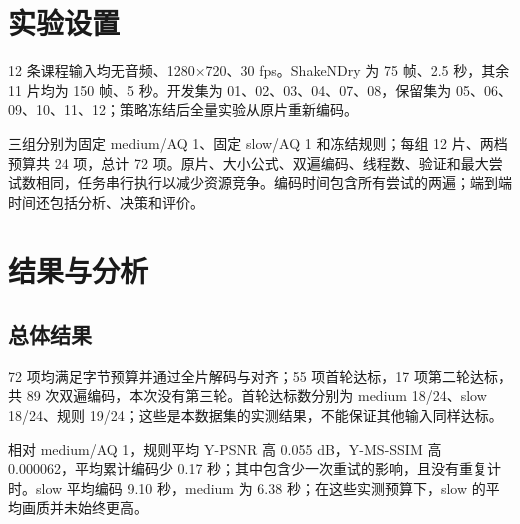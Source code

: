 \documentclass[UTF8,12pt,a4paper,twocolumn]{ctexart}
\begin{document}
\section{实验设置}
12 条课程输入均无音频、1280$\times$720、30 fps。ShakeNDry 为 75 帧、2.5 秒，其余 11 片均为 150 帧、5 秒。开发集为 01、02、03、04、07、08，保留集为 05、06、09、10、11、12；策略冻结后全量实验从原片重新编码。

三组分别为固定 medium/AQ 1、固定 slow/AQ 1 和冻结规则；每组 12 片、两档预算共 24 项，总计 72 项。原片、大小公式、双遍编码、线程数、验证和最大尝试数相同，任务串行执行以减少资源竞争。编码时间包含所有尝试的两遍；端到端时间还包括分析、决策和评价。
\begin{table}[H]\centering\caption{每组 24 个视频预算配对的等权平均结果。}\end{table}
\section{结果与分析}
\subsection{总体结果}
72 项均满足字节预算并通过全片解码与对齐；55 项首轮达标，17 项第二轮达标，共 89 次双遍编码，本次没有第三轮。首轮达标数分别为 medium 18/24、slow 18/24、规则 19/24；这些是本数据集的实测结果，不能保证其他输入同样达标。

相对 medium/AQ 1，规则平均 Y-PSNR 高 0.055 dB，Y-MS-SSIM 高 0.000062，平均累计编码少 0.17 秒；其中包含少一次重试的影响，且没有重复计时。slow 平均编码 9.10 秒，medium 为 6.38 秒；在这些实测预算下，slow 的平均画质并未始终更高。
\end{document}

